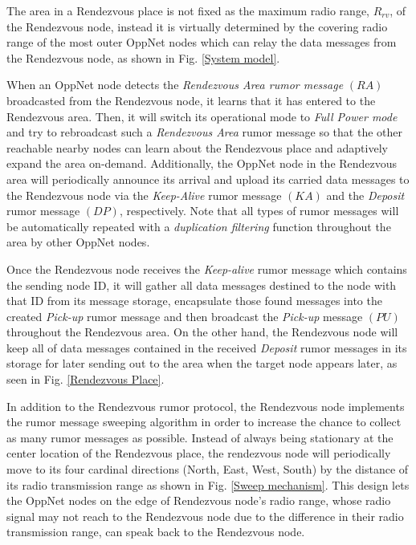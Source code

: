 \documentclass[conference]{IEEEtran}
\begin{document}
The area in a Rendezvous place is not fixed as the maximum radio range, $R_{rv}$,  of the Rendezvous node, instead it is virtually determined by the covering radio range of the most outer OppNet nodes which can relay the data messages from the Rendezvous node, as shown in Fig. \ref{System model}.

When an OppNet node detects the \emph{Rendezvous Area rumor message} $(RA)$ broadcasted from the Rendezvous node, it learns that it has entered to the Rendezvous area.
%
Then, it will switch its operational mode to \emph{Full Power mode} and try to rebroadcast such a \emph{Rendezvous Area }rumor message so that the other reachable nearby nodes can learn about the Rendezvous place and adaptively expand the area on-demand.
%
Additionally, the OppNet node in the Rendezvous area will periodically announce its arrival and upload its carried data messages to the Rendezvous node via the \emph{Keep-Alive} rumor message $(KA)$ and the \emph{Deposit} rumor message $(DP)$, respectively.
%
Note that all types of rumor messages will be automatically repeated with a \emph{duplication filtering} function throughout the area by other OppNet nodes.

Once the Rendezvous node receives the \emph{Keep-alive} rumor message which contains the sending node ID, it will gather all data messages destined to the node with that ID from its message storage, encapsulate those found messages into the created \emph{Pick-up} rumor message and then broadcast the \emph{Pick-up} message $(PU)$ throughout the Rendezvous area.
%
On the other hand, the Rendezvous node will keep all of data messages contained in the received \emph{Deposit} rumor messages in its storage for later sending out to the area when the target node appears later, as seen in Fig. \ref{Rendezvous Place}. 

In addition to the Rendezvous rumor protocol, the Rendezvous node implements the rumor message sweeping algorithm in order to increase the chance to collect as many rumor messages as possible.
%
Instead of always being stationary at the center location of the Rendezvous place, the rendezvous node will periodically move to its four cardinal directions (North, East, West, South) by the distance of its radio transmission range as shown in Fig. \ref{Sweep mechanism}.
%
This design lets the OppNet nodes on the edge of Rendezvous node's radio range, whose radio signal may not reach to the Rendezvous node due to the difference in their radio transmission range, can speak back to the Rendezvous node.
\end{document}

